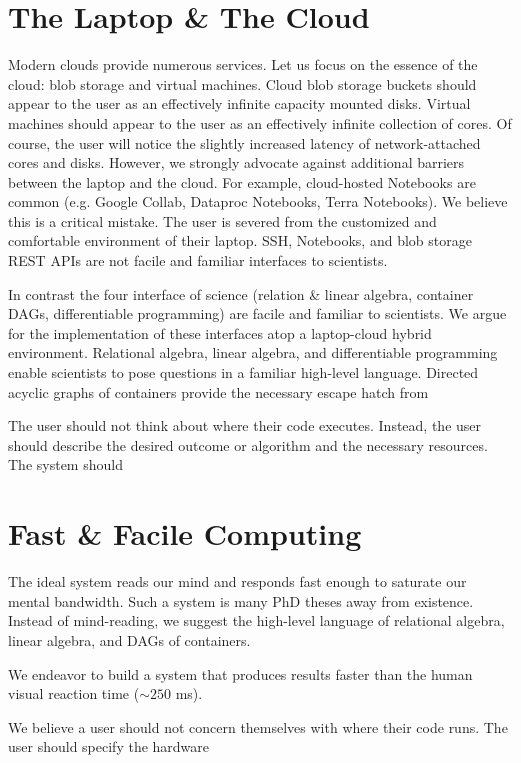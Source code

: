 \documentclass[10pt,a4paper%
]{article}
\begin{document}
\section{The Laptop \& The Cloud}

Modern clouds provide numerous services.
Let us focus on the essence of the cloud: blob storage and virtual machines.
Cloud blob storage buckets should appear to the user as an effectively infinite capacity mounted disks.
Virtual machines should appear to the user as an effectively infinite collection of cores.
Of course, the user will notice the slightly increased latency of network-attached cores and disks.
However, we strongly advocate against additional barriers between the laptop and the cloud.
For example, cloud-hosted Notebooks are common (e.g. Google Collab, Dataproc Notebooks, Terra Notebooks).
We believe this is a critical mistake.
The user is severed from the customized and comfortable environment of their laptop.
SSH, Notebooks, and blob storage REST APIs are not facile and familiar interfaces to scientists.

In contrast the four interface of science (relation \& linear algebra, container DAGs, differentiable programming) are facile and familiar to scientists.
We argue for the implementation of these interfaces atop a laptop-cloud hybrid environment.
Relational algebra, linear algebra, and differentiable programming enable scientists to pose questions in a familiar high-level language.
Directed acyclic graphs of containers provide the necessary escape hatch from

The user should not think about where their code executes.
Instead, the user should describe the desired outcome or algorithm and the necessary resources.
The system should

\section{Fast \& Facile Computing}

The ideal system reads our mind and responds fast enough to saturate our mental bandwidth.
Such a system is many PhD theses away from existence.
Instead of mind-reading, we suggest the high-level language of relational algebra, linear algebra, and DAGs of containers.

We endeavor to build a system that produces results faster than the human visual reaction time ($\sim250$ ms).

We believe a user should not concern themselves with where their code runs.
The user should specify the hardware
\end{document}
